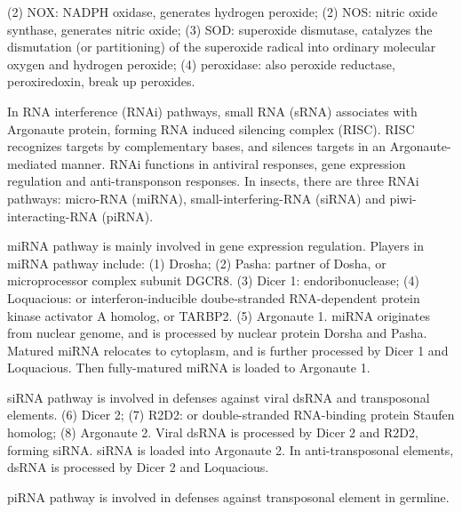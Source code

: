 \documentclass[11pt]{article}
\begin{document}
\begin{sloppypar}
(2) NOX: NADPH oxidase, generates hydrogen peroxide; \newline
(2) NOS: nitric oxide synthase, generates nitric oxide; \newline
(3) SOD: superoxide dismutase, catalyzes the dismutation (or partitioning) of the superoxide radical into ordinary molecular oxygen and hydrogen peroxide; \newline
(4) peroxidase: also peroxide reductase, peroxiredoxin, break up peroxides.  
\par
In RNA interference (RNAi) pathways, small RNA (sRNA) associates with Argonaute protein, forming RNA induced silencing complex (RISC). 
RISC recognizes targets by complementary bases, and silences targets in an Argonaute-mediated manner. 
RNAi functions in antiviral responses, gene expression regulation and anti-transponson responses. 
In insects, there are three RNAi pathways: micro-RNA (miRNA), small-interfering-RNA (siRNA) and piwi-interacting-RNA (piRNA). 
\par
miRNA pathway is mainly involved in gene expression regulation. 
Players in miRNA pathway include: 
\newline
(1) Drosha; \newline
(2) Pasha: partner of Dosha, or microprocessor complex subunit DGCR8. \newline
(3) Dicer 1: endoribonuclease; \newline
(4) Loquacious: or interferon-inducible doube-stranded RNA-dependent protein kinase activator A homolog, or TARBP2. \newline
(5) Argonaute 1. \newline
miRNA originates from nuclear genome, and is processed by nuclear protein Dorsha and Pasha. 
Matured miRNA relocates to cytoplasm, and is further processed by Dicer 1 and Loquacious. 
Then fully-matured miRNA is loaded to Argonaute 1.
\par 
siRNA pathway is involved in defenses against viral dsRNA and transposonal elements. 
\newline
(6) Dicer 2; \newline
(7) R2D2: or double-stranded RNA-binding protein Staufen homolog; \newline
(8) Argonaute 2. \newline
Viral dsRNA is processed by Dicer 2 and R2D2, forming siRNA. 
siRNA is loaded into Argonaute 2. 
In anti-transposonal elements, dsRNA is processed by Dicer 2 and Loquacious. 
\par
piRNA pathway is involved in defenses against transposonal element in germline. 

\end{sloppypar}
\end{document}
